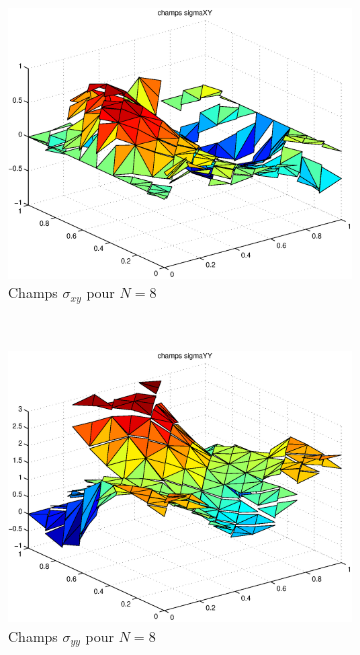 \begin{figure}[h!]
\begin{subfigure}[b]{0.32\textwidth}
  \includegraphics[width=\textwidth]{images/sigmaxyN8.eps}
  \caption{Champs $\sigma_{xy}$ pour $N=8$}
  \end{subfigure}
  ~
  \begin{subfigure}[b]{0.32\textwidth}
  \includegraphics[width=\textwidth]{images/sigmayyN8.eps}
  \caption{Champs $\sigma_{yy}$ pour $N=8$}
  \end{subfigure}
  \begin{subfigure}[b]{0.32\textwidth}

\end{subfigure}
\end{figure}
